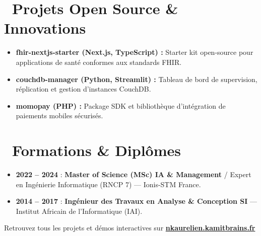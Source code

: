 \documentclass[10pt,a4paper]{article}
\begin{document}
\section{\faRocket\ Projets Open Source \& Innovations}
\begin{itemize}[leftmargin=1.4em, itemsep=0.25em, topsep=0.15em]
    \item \textbf{fhir-nextjs-starter (Next.js, TypeScript) :} Starter kit open-source pour applications de santé conformes aux standards FHIR.
    \item \textbf{couchdb-manager (Python, Streamlit) :} Tableau de bord de supervision, réplication et gestion d'instances CouchDB.
    \item \textbf{momopay (PHP) :} Package SDK et bibliothèque d'intégration de paiements mobiles sécurisés.
\end{itemize}

\section{\faGraduationCap\ Formations \& Diplômes}
\begin{itemize}[leftmargin=1.4em, itemsep=0.25em, topsep=0.15em]
    \item \textbf{2022 -- 2024} : \textbf{Master of Science (MSc) IA \& Management} / Expert en Ingénierie Informatique (RNCP 7) --- Ionis-STM France.
    \item \textbf{2014 -- 2017} : \textbf{Ingénieur des Travaux en Analyse \& Conception SI} --- Institut Africain de l'Informatique (IAI).
\end{itemize}

\vspace{0.8em}
\begin{center}
    \footnotesize\color{slateGray}
    Retrouvez tous les projets et démos interactives sur \href{https://nkaurelien.kamitbrains.fr}{\textbf{nkaurelien.kamitbrains.fr}}
\end{center}
\end{document}
